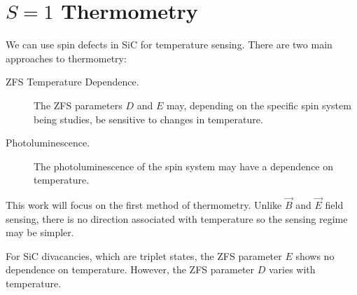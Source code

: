 \section{$S=1$ Thermometry}
\cite{Chen2011}
\cite{ajev2009}
\cite{PhysRevApplied.8.044015}
\cite{D3NR00430A}
\cite{PhysRevApplied.10.044042}
\cite{PhysRevB.104.125305}
\cite{PhysRevB.91.155404}

\cite{Quan:23}



We can use spin defects in SiC for temperature sensing. 
There are two main approaches to thermometry:
\begin{description}
    \item[ZFS Temperature Dependence.] The ZFS parameters $D$ and $E$ may, depending on the specific spin system being studies, be sensitive to changes in temperature. 
    \item[Photoluminescence.] The photoluminescence of the spin system may have a dependence on temperature. 
\end{description}

This work will focus on the first method of thermometry. Unlike $\vec{B}$ and $\vec{E}$ field sensing, there is no direction associated with temperature so the sensing regime may be simpler.  

For SiC divacancies, which are triplet states, the ZFS parameter $E$ shows no dependence on temperature. However, the ZFS parameter $D$ varies with temperature. 

